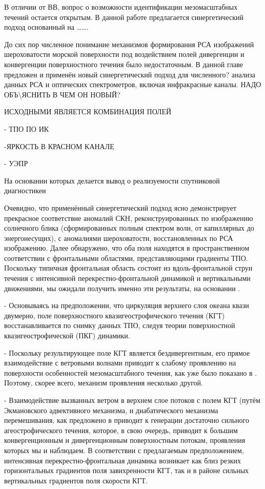 В отличии от ВВ, вопрос о возможности идентификации мезомасштабных течений остается открытым. В данной работе предлагается синергетический подход основанный на \dots \dots .

 

До сих пор численное понимание механизмов формирования РСА изображений шероховатости морской поверхности под воздействием полей дивергенции и конвергенции поверхностного течения было недостаточным. В данной главе предложен и применён новый синергетический подход для численного? анализа данных РСА и оптических спектрометров, включая инфракрасные каналы. НАДО ОБЪ\textbackslash ЯСНИТЬ В ЧЕМ ОН НОВЫЙ?

ИСХОДНЫМИ ЯВЛЯЕТСЯ КОМБИНАЦИЯ ПОЛЕЙ

- ТПО ПО ИК

-ЯРКОСТЬ В КРАСНОМ КАНАЛЕ

- УЭПР 



На основании которых делается вывод о реализуемости спутниковой диагностикеи 

Очевидно, что применённый синергетический подход ясно демонстрирует прекрасное соответствие аномалий СКН, реконструированных по изображению солнечного блика (сформированных полным спектром волн, от капиллярных до энергонесущих), с аномалиями шероховатости, восстановленных по РСА изображению. Далее обнаружено, что оба поля находятся в пространственном соответствии с фронтальными областями, представляющими градиенты ТПО. Поскольку типичная фронтальная область состоит из вдоль-фронтальной струи течения с интенсивной перекрестно-фронтальной динамикой и вертикальными движениями, мы ожидали получить именно эти результаты, на основании \citep{Kudryavtsev2005,Johannessen2005}.

- Основываясь на предположении, что циркуляция верхнего слоя океана квази двумерно, поле поверхностного квазигеострофического течения (КГТ) восстанавливается по снимку данных ТПО, следуя теории поверхностной квазигеострофической (ПКГ) динамики. 

- Поскольку результирующее поле КГТ является бездивергентным, его прямое взаимодействие с ветровыми волнами приводит к слабому проявлению на поверхности особенностей мезомасштабного течения, как уже было показано в \citep{Kudryavtsev2005,Johannessen2005}. Поэтому, скорее всего, механизм проявления несколько другой. 

- Взаимодействие вызванных ветром в верхнем слое потоков с полем КГТ (путём Экмановского адвективного механизма, и диабатического механизма перемешивания, как предложено в \citep{Klein1990,Garrett1981}  приводит к генерации достаточно сильного агеострофического течения, которое, в свою очередь, приводит к большим конвергенционным и дивергенционным поверхностным потокам, проявления которых мы и наблюдаем. В соответствии с предлагаемым предположением, интенсивная перекрестно-фронтальная динамика возникает как близ резких горизонтальных градиентов поля завихренности КГТ, так и в районе сильных вертикальных градиентов поля скорости КГТ.

